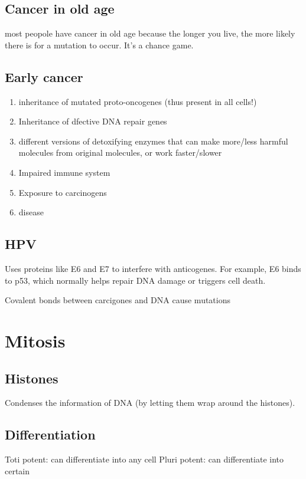 \documentclass[12pt]{article}
\begin{document}
\subsection{Cancer in old age}
most peopole have cancer in old age because the longer you live,
the more likely there is for a mutation to occur. It's a chance game.

\subsection{Early cancer}
\begin{enumerate}
    \item inheritance of mutated proto-oncogenes (thus present in all cells!)
    \item Inheritance of dfective DNA repair genes
    \item different versions of detoxifying enzymes that can 
    make more/less harmful molecules from original molecules, or work faster/slower
    \item Impaired immune system
    \item Exposure to carcinogens 
    \item disease
\end{enumerate}

\subsection{HPV}
Uses proteins like E6 and E7 to interfere with anticogenes. 
For example, E6 binds to p53, which normally helps repair
DNA damage or triggers cell death. 

\begin{definition}[Carcinogens]
    Covalent bonds between carcigones and DNA cause mutations
\end{definition}

\section{Mitosis}
\subsection{Histones}
Condenses the information of DNA (by letting them wrap around 
the histones). 

\subsection{Differentiation}
Toti potent: can differentiate into any cell
Pluri potent: can differentiate into certain 
\end{document}
